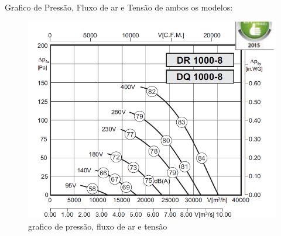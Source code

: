 Grafico de Pressão, Fluxo de ar e Tensão de ambos os modelos:

	\begin{figure}[!htbp]
	 \centering
	  \includegraphics[scale=0.5]{editaveis/figuras/grafico_pressao_fluxo_ar}
	  \caption[grafico de pressão, fluxo de ar e tensão]{grafico de pressão, fluxo de ar e tensão\footnotemark}
	  \label{grafico_pressao_fluxo_ar}
	\end{figure}
	\FloatBarrier
